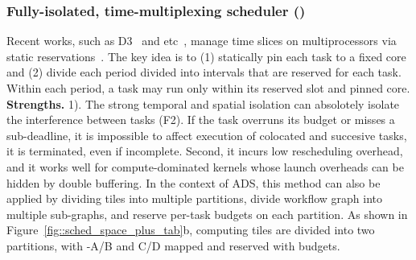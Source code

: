 
\subsubsection{Fully-isolated, time-multiplexing scheduler (\CyclicName)}\label{sec:full_isolated_scheduler}
Recent works, such as D3~\cite{Gog2022-Eurosys-D3} and etc~\cite{McLean2020-tttech_tablescheduling}, manage time slices on multiprocessors via static reservations~\cite{Casini2019}. The key idea is to (1) statically pin each task to a fixed core and (2) divide each period divided into  \execTime intervals that are reserved for each task. Within each period, a task may run only within its reserved slot and pinned core. 
\textbf{Strengths.} 1). The strong temporal and spatial isolation can absolotely isolate the interference between tasks (F2). 
If the task overruns its budget or misses a sub-deadline, it is impossible to affect execution of colocated and succesive tasks, it is terminated, even if incomplete. Second, it incurs low rescheduling overhead, and it works well for compute-dominated kernels whose launch overheads can be hidden by double buffering. 
%
In the context of \ADSArch ADS, this method can also be applied by dividing tiles into multiple partitions, divide workflow graph into multiple sub-graphs, and reserve per-task budgets on each partition. As shown in Figure~\ref{fig::sched_space_plus_tab}b, computing tiles are divided into two partitions, with \singlefuncs-A/B and C/D mapped and reserved with budgets.

